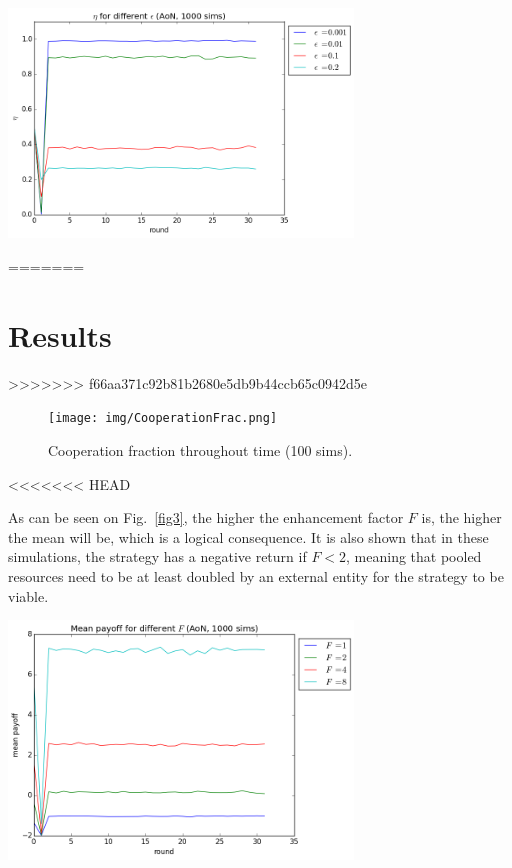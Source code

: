 \documentclass[letterpaper]{article}
\begin{document}
\vspace{5 mm}
\includegraphics[width=3.6in,angle=0]{img/cfraction_epsilon_aon.png}
\label{fig2}
\vspace{5 mm}

=======

\section{Results}

>>>>>>> f66aa371c92b81b2680e5db9b44ccb65c0942d5e

\begin{figure}[!htb]
\begin{center}
\texttt{[image: img/CooperationFrac.png]}
\caption{Cooperation fraction throughout time (100 sims).}
\label{fig1}
\end{center}
\end{figure}


<<<<<<< HEAD

As can be seen on Fig.~\ref{fig3}, the higher the enhancement factor $F$ is, the higher the mean will be, which is a logical consequence. It is also shown that in these simulations, the strategy has a negative return if $F<2$, meaning that pooled resources need to be at least doubled by an external entity for the strategy to be viable.


\vspace{5 mm}
\includegraphics[width=3.6in,angle=0]{img/meanpayoff_F_aon.png}
\label{fig3}
\vspace{5 mm}
\end{document}
